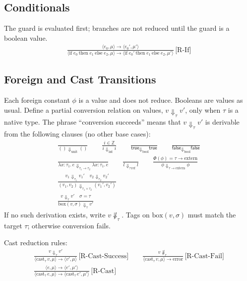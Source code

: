 \documentclass[11pt,a4paper]{article}
\begin{document}
\subsection{Conditionals}
The guard is evaluated first; branches are not reduced until the guard is a boolean value.
\begin{gather*}
  \frac{\langle e_0, \mu \rangle \to \langle e_0', \mu' \rangle}{\langle \text{if}\; e_0\ \text{then}\; e_1\ \text{else}\; e_2, \mu \rangle \to \langle \text{if}\; e_0'\ \text{then}\; e_1\ \text{else}\; e_2, \mu' \rangle}\,\text{[R-If]}
\end{gather*}

\subsection{Foreign and Cast Transitions}
Each foreign constant $\phi$ is a value and does not reduce. Booleans are values as usual.
Define a partial conversion relation on values, $v \Downarrow_{\tau} v'$, only when $\tau$ is a native type.
The phrase ``conversion succeeds'' means that $v \Downarrow_{\tau} v'$ is derivable from the following clauses (no other base cases):
\[
\begin{gathered}
  \frac{}{() \Downarrow_{\text{unit}} ()}
  \qquad
  \frac{i \in \mathbb{Z}}{i \Downarrow_{\text{int}} i}
  \qquad
  \frac{}{\textsf{true} \Downarrow_{\text{bool}} \textsf{true}}
  \qquad
  \frac{}{\textsf{false} \Downarrow_{\text{bool}} \textsf{false}}
  \\[0.75em]
  \frac{}{\lambda x{:}\tau_1.\, e \Downarrow_{\tau_1 \to \tau_2} \lambda x{:}\tau_1.\, e}
  \qquad
  \frac{}{l \Downarrow_{\tau\,\text{ref}} l}
  \qquad
  \frac{\Phi(\phi) = \tau \to \text{extern}}{\phi \Downarrow_{\tau \to \text{extern}} \phi}
  \\[0.75em]
  \frac{v_1 \Downarrow_{\tau_1} v_1' \quad v_2 \Downarrow_{\tau_2} v_2'}{(v_1, v_2) \Downarrow_{\tau_1 \times \tau_2} (v_1', v_2')}
  \\[0.75em]
  \frac{v \Downarrow_{\tau} v' \quad \sigma = \tau}{\text{box}(v, \sigma) \Downarrow_{\tau} v'}
\end{gathered}
\]
If no such derivation exists, write $v \not\Downarrow_{\tau}$.
Tags on $\text{box}(v, \sigma)$ must match the target $\tau$; otherwise conversion fails.

Cast reduction rules:
\begin{gather*}
  \frac{v \Downarrow_{\tau} v'}{\langle \text{cast}_{\tau}\, v, \mu \rangle \to \langle v', \mu \rangle}\,\text{[R-Cast-Success]}
  \qquad
  \frac{v \not\Downarrow_{\tau}}{\langle \text{cast}_{\tau}\, v, \mu \rangle \to \text{error}}\,\text{[R-Cast-Fail]}
  \\[0.75em]
  \frac{\langle e, \mu \rangle \to \langle e', \mu' \rangle}{\langle \text{cast}_{\tau}\, e, \mu \rangle \to \langle \text{cast}_{\tau}\, e', \mu' \rangle}\,\text{[R-Cast]}
\end{gather*}
\end{document}
